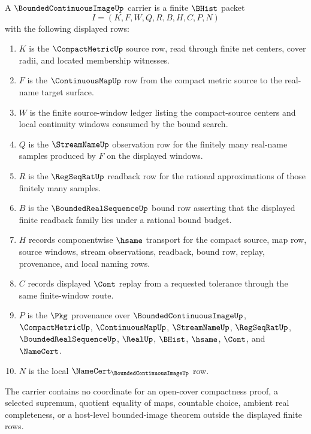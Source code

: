 \begin{definition}
\label{def:bounded-continuous-image-carrier}
A $\BoundedContinuousImageUp$ carrier is a finite $\BHist$ packet
$$
I=(K,F,W,Q,R,B,H,C,P,N)
$$
with the following displayed rows:
\begin{enumerate}
\item $K$ is the $\CompactMetricUp$ source row, read through finite net centers, cover radii, and located membership witnesses.
\item $F$ is the $\ContinuousMapUp$ row from the compact metric source to the real-name target surface.
\item $W$ is the finite source-window ledger listing the compact-source centers and local continuity windows consumed by the bound search.
\item $Q$ is the $\StreamNameUp$ observation row for the finitely many real-name samples produced by $F$ on the displayed windows.
\item $R$ is the $\RegSeqRatUp$ readback row for the rational approximations of those finitely many samples.
\item $B$ is the $\BoundedRealSequenceUp$ bound row asserting that the displayed finite readback family lies under a rational bound budget.
\item $H$ records componentwise $\hsame$ transport for the compact source, map row, source windows, stream observations, readback, bound row, replay, provenance, and local naming rows.
\item $C$ records displayed $\Cont$ replay from a requested tolerance through the same finite-window route.
\item $P$ is the $\Pkg$ provenance over $\BoundedContinuousImageUp$, $\CompactMetricUp$, $\ContinuousMapUp$, $\StreamNameUp$, $\RegSeqRatUp$, $\BoundedRealSequenceUp$, $\RealUp$, $\BHist$, $\hsame$, $\Cont$, and $\NameCert$.
\item $N$ is the local $\NameCert_{\BoundedContinuousImageUp}$ row.
\end{enumerate}
The carrier contains no coordinate for an open-cover compactness proof, a selected supremum, quotient equality of maps, countable choice, ambient real completeness, or a host-level bounded-image theorem outside the displayed finite rows.
\end{definition}

